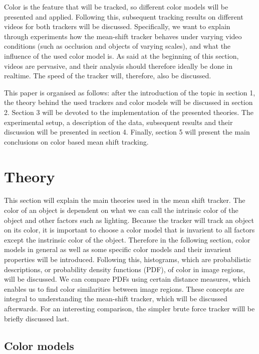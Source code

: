 \documentclass[a4paper,11pt]{article}
\begin{document}
Color is the feature that will be tracked, so different color models will be presented and applied. Following this, subsequent tracking results on different videos for both trackers will be discussed. Specifically, we want to explain through experiments how the mean-shift tracker behaves under varying video conditions (such as occlusion and objects of varying scales), and what the influence of the used color model is.
	As said at the beginning of this section, videos are pervasive, and their analysis should therefore ideally be done in realtime. The speed of the tracker will, therefore, also be discussed. 
	
	This paper is organised as follows:  after the introduction of the topic in section 1, the theory behind the used trackers and color models will be discussed in section 2.
	Section 3 will be devoted to the implementation of the presented theories. The experimental setup, a description of the data, subsequent results and their discussion will be presented in section 4. 
	Finally, section 5 will present the main conclusions on color based mean shift tracking.

\section{Theory}	
	This section will explain the main theories used in the mean shift tracker. The color of an object is dependent on what we can call the intrinsic color of the object and other factors such as lighting. Because the tracker will track an object on its color, it is important to choose a color model that is invarient to all factors except the instrinsic color of the object. Therefore in the following section, color models in general as well as some specific color models and their invarient properties will be introduced. Following this, histograms, which are probabilistic descriptions, or probability density functions (PDF), of color in image regions, will be discussed. We can compare PDFs using certain distance measures, which enables us to find color similarities between image regions. These concepts are integral to understanding the mean-shift tracker, which will be discussed afterwards. For an interesting comparison, the simpler brute force tracker willl be briefly discussed last.  


\subsection{Color models}
\end{document}

